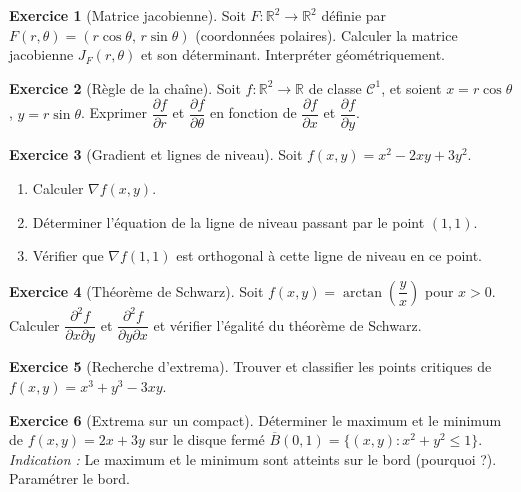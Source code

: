\documentclass[12pt,a4paper,openany]{book}
\theoremstyle{definition}
\newtheorem{exercice}{Exercice}[chapter]
\newcommand{\R}{\mathbb{R}}
\begin{document}
\begin{exercice}[Matrice jacobienne]
  \label{exo:jacobienne}
  Soit $F \colon \R^2 \to \R^2$ définie par $F(r, \theta) = (r \cos\theta, \, r \sin\theta)$ (coordonnées polaires). Calculer la matrice jacobienne $J_F(r, \theta)$ et son déterminant. Interpréter géométriquement.
\end{exercice}

\begin{exercice}[Règle de la chaîne]
  \label{exo:chain-rule}
  Soit $f \colon \R^2 \to \R$ de classe $\mathcal{C}^1$, et soient $x = r\cos\theta$, $y = r\sin\theta$. Exprimer $\dfrac{\partial f}{\partial r}$ et $\dfrac{\partial f}{\partial \theta}$ en fonction de $\dfrac{\partial f}{\partial x}$ et $\dfrac{\partial f}{\partial y}$.
\end{exercice}

\begin{exercice}[Gradient et lignes de niveau]
  \label{exo:gradient-lignes-niveau}
  Soit $f(x,y) = x^2 - 2xy + 3y^2$.
  \begin{enumerate}[label=(\alph*)]
    \item Calculer $\nabla f(x,y)$.
    \item Déterminer l'équation de la ligne de niveau passant par le point $(1,1)$.
    \item Vérifier que $\nabla f(1,1)$ est orthogonal à cette ligne de niveau en ce point.
  \end{enumerate}
\end{exercice}

\begin{exercice}[Théorème de Schwarz]
  \label{exo:schwarz}
  Soit $f(x,y) = \arctan\!\left(\dfrac{y}{x}\right)$ pour $x > 0$. Calculer $\dfrac{\partial^2 f}{\partial x \partial y}$ et $\dfrac{\partial^2 f}{\partial y \partial x}$ et vérifier l'égalité du théorème de Schwarz.
\end{exercice}

\begin{exercice}[Recherche d'extrema]
  \label{exo:extrema-1}
  Trouver et classifier les points critiques de $f(x,y) = x^3 + y^3 - 3xy$.
\end{exercice}

\begin{exercice}[Extrema sur un compact]
  \label{exo:extrema-compact}
  Déterminer le maximum et le minimum de $f(x,y) = 2x + 3y$ sur le disque fermé $\overline{B}(0,1) = \{(x,y) : x^2 + y^2 \leqslant 1\}$.
  \emph{Indication :} Le maximum et le minimum sont atteints sur le bord (pourquoi ?). Paramétrer le bord.
\end{exercice}
\end{document}
